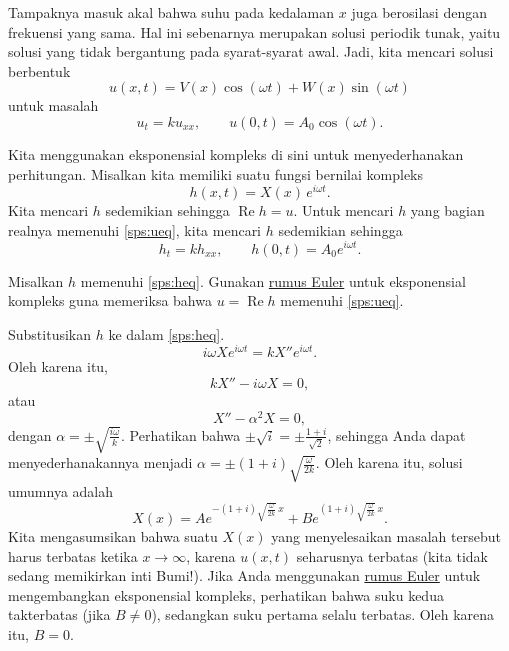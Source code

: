 Tampaknya masuk akal bahwa suhu pada kedalaman $x$ juga berosilasi
dengan frekuensi yang sama.  Hal ini sebenarnya merupakan solusi periodik
tunak, yaitu solusi yang tidak bergantung pada syarat-syarat awal.
Jadi, kita mencari solusi berbentuk
\begin{equation*}
u(x,t) = V(x) \cos (\omega t) + W (x) \sin ( \omega t)
\end{equation*}
untuk masalah
\begin{equation} \label{sps:ueq}
u_t = k u_{xx}, \qquad u(0,t) = A_0 \cos ( \omega t) .
\end{equation}

Kita menggunakan eksponensial kompleks di sini untuk menyederhanakan perhitungan.
Misalkan kita memiliki suatu fungsi bernilai kompleks
\begin{equation*}
h(x,t) = X(x)\, e^{i\omega t} .
\end{equation*}
Kita mencari $h$ sedemikian sehingga $\operatorname{Re} h = u$.
Untuk mencari $h$ yang bagian realnya memenuhi \eqref{sps:ueq}, kita mencari
$h$ sedemikian sehingga
\begin{equation} \label{sps:heq}
h_t = k h_{xx}, \qquad h(0,t) = A_0 e^{i\omega t} .
\end{equation}

\begin{exercise}
Misalkan $h$ memenuhi \eqref{sps:heq}.
Gunakan \hyperref[eulersformula]{rumus Euler} untuk eksponensial kompleks guna
memeriksa bahwa $u = \operatorname{Re} h$ memenuhi \eqref{sps:ueq}.
\end{exercise}

Substitusikan $h$ ke dalam \eqref{sps:heq}.
\begin{equation*}
i\omega X e^{i\omega t} = k X'' e^{i \omega t} .
\end{equation*}
Oleh karena itu,
\begin{equation*}
k X''  - i \omega X = 0 ,
\end{equation*}
atau 
\begin{equation*}
X''  - \alpha^2 X = 0 ,
\end{equation*}
dengan $\alpha = \pm \sqrt{\frac{i\omega}{k}}$.  Perhatikan bahwa $\pm \sqrt{i} = \pm
\frac{1+i}{\sqrt{2}}$, sehingga Anda dapat menyederhanakannya menjadi
$\alpha = \pm (1+i)\sqrt{\frac{\omega}{2k}}$.
Oleh karena itu, solusi umumnya adalah
\begin{equation*}
X(x) = A e^{-(1+i)\sqrt{\frac{\omega}{2k}} \, x}
+ B e^{(1+i)\sqrt{\frac{\omega}{2k}} \, x} .
\end{equation*}
Kita mengasumsikan bahwa suatu $X(x)$ yang menyelesaikan masalah tersebut harus terbatas ketika $x \to
\infty$, karena $u(x,t)$ seharusnya terbatas
(kita tidak sedang memikirkan inti Bumi!).
Jika Anda menggunakan \hyperref[eulersformula]{rumus Euler} untuk mengembangkan eksponensial kompleks, 
perhatikan bahwa suku kedua takterbatas (jika $B \neq 0$),
sedangkan suku pertama selalu terbatas.  Oleh karena itu, $B=0$.

